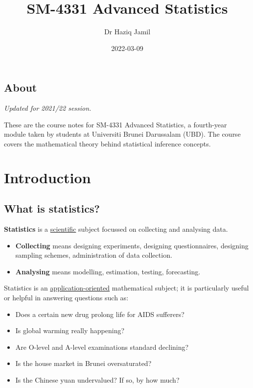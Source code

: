 \documentclass[
]{book}
\title{SM-4331 Advanced Statistics}
\author{Dr Haziq Jamil}
\date{2022-03-09}
\providecommand{\tightlist}{%
  \setlength{\itemsep}{0pt}\setlength{\parskip}{0pt}}
\theoremstyle{definition}
\theoremstyle{definition}
\theoremstyle{definition}
\theoremstyle{definition}
\theoremstyle{remark}
\begin{document}
\maketitle

{
\setcounter{tocdepth}{1}
\tableofcontents
}
\hypertarget{about}{%
\chapter*{About}\label{about}}

\emph{Updated for 2021/22 session.}

These are the course notes for SM-4331 Advanced Statistics, a fourth-year module taken by students at Universiti Brunei Darussalam (UBD).
The course covers the mathematical theory behind statistical inference concepts.

\hypertarget{part-introduction}{%
\part{Introduction}\label{part-introduction}}

\hypertarget{what-is-statistics}{%
\chapter*{What is statistics?}\label{what-is-statistics}}

\textbf{Statistics} is a \uline{scientific} subject focussed on collecting and analysing data.

\begin{itemize}
\tightlist
\item
  \textbf{Collecting} means designing experiments, designing
  questionnaires, designing sampling schemes, administration of data
  collection.
\item
  \textbf{Analysing} means modelling, estimation, testing, forecasting.
\end{itemize}

Statistics is an \uline{application-oriented} mathematical subject; it is
particularly useful or helpful in answering questions such as:

\begin{itemize}
\tightlist
\item
  Does a certain new drug prolong life for AIDS sufferers?
\item
  Is global warming really happening?
\item
  Are O-level and A-level examinations standard declining?
\item
  Is the house market in Brunei oversaturated?
\item
  Is the Chinese yuan undervalued? If so, by how much?
\end{itemize}
\end{document}
